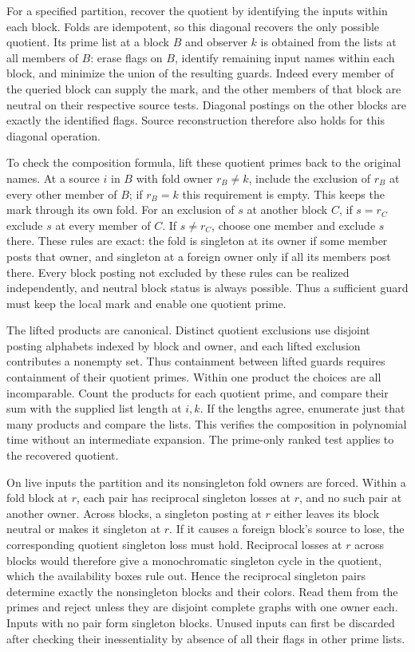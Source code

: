 For a specified partition, recover the quotient by
identifying the inputs within each block. Folds
are idempotent, so this diagonal recovers the only
possible quotient. Its prime list at a block $B$ and
observer $k$ is obtained from the lists at all members
of $B$: erase flags on $B$, identify remaining input
names within each block, and minimize the union of
the resulting guards. Indeed every member of the
queried block can supply the mark, and the other
members of that block are neutral on their respective
source tests. Diagonal postings on the other blocks
are exactly the identified flags. Source reconstruction
therefore also holds for this diagonal operation.

To check the composition formula, lift these quotient
primes back to the original names. At a source $i$
in $B$ with fold owner $r_B\ne k$, include the
exclusion of $r_B$ at every other member of $B$;
if $r_B=k$ this requirement is empty. This keeps
the mark through its own fold. For an exclusion of
$s$ at another block $C$, if $s=r_C$ exclude $s$
at every member of $C$. If $s\ne r_C$, choose one
member and exclude $s$ there. These rules are exact:
the fold is singleton at its owner if some member
posts that owner, and singleton at a foreign owner
only if all its members post there. Every block
posting not excluded by these rules can be realized
independently, and neutral block status is always
possible. Thus a sufficient guard must keep the
local mark and enable one quotient prime.

The lifted products are canonical. Distinct quotient
exclusions use disjoint posting alphabets indexed by
block and owner, and each lifted exclusion contributes
a nonempty set. Thus containment between lifted guards
requires containment of their quotient primes. Within
one product the choices are all incomparable. Count
the products for each quotient prime, and compare
their sum with the supplied list length at $i,k$.
If the lengths agree, enumerate just that many
products and compare the lists. This verifies the
composition in polynomial time without an intermediate
expansion. The prime-only ranked test applies to
the recovered quotient.

On live inputs the partition and its nonsingleton
fold owners are forced. Within a fold block at $r$,
each pair has reciprocal singleton losses at $r$,
and no such pair at another owner. Across blocks,
a singleton posting at $r$ either leaves its block
neutral or makes it singleton at $r$. If it causes
a foreign block's source to lose, the corresponding
quotient singleton loss must hold. Reciprocal losses
at $r$ across blocks would therefore give a
monochromatic singleton cycle in the quotient,
which the availability boxes rule out. Hence the
reciprocal singleton pairs determine exactly the
nonsingleton blocks and their colors. Read them from
the primes and reject unless they are disjoint
complete graphs with one owner each. Inputs with no
pair form singleton blocks. Unused inputs can first
be discarded after checking their inessentiality
by absence of all their flags in other prime lists.


